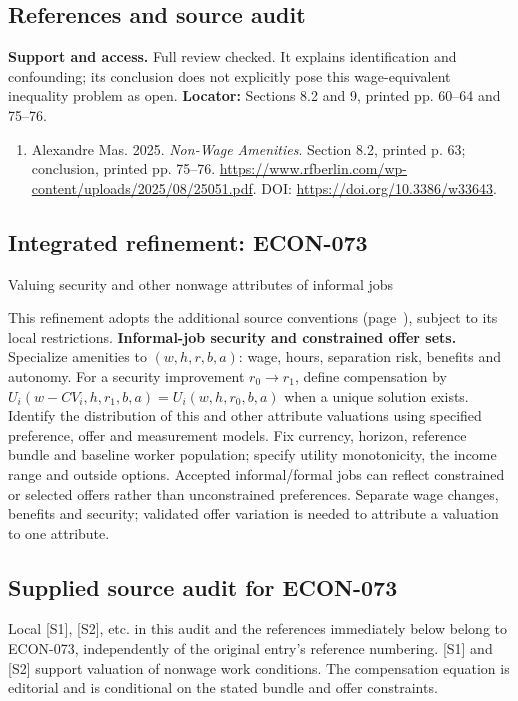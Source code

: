 \documentclass[11pt,a4paper]{article}
\begin{document}
\subsection*{References and source audit}
\textbf{Support and access.} Full review checked. It explains identification and confounding; its conclusion does not explicitly pose this wage-equivalent inequality problem as open. \textbf{Locator:} Sections 8.2 and 9, printed pp. 60--64 and 75--76.
\begin{enumerate}\raggedright
\item\hypertarget{definitions:source:30007637:1}{} Alexandre Mas. 2025. \emph{Non-Wage Amenities}. Section 8.2, printed p. 63; conclusion, printed pp. 75–76.
\url{https://www.rfberlin.com/wp-content/uploads/2025/08/25051.pdf}.
DOI: \url{https://doi.org/10.3386/w33643}.
\end{enumerate}

\subsection*{Integrated refinement: ECON-073}
{\sffamily\small\color{muted}Valuing security and other nonwage attributes of informal jobs\par}
This refinement adopts the additional source conventions
(page~\pageref{audited:conventions}), subject to its local restrictions.
\textbf{Informal-job security and constrained offer sets.}
Specialize amenities to $(w,h,r,b,a)$: wage, hours, separation risk, benefits and
autonomy. For a security improvement $r_0\to r_1$, define compensation by
$U_i(w-CV_i,h,r_1,b,a)=U_i(w,h,r_0,b,a)$ when a unique solution exists.
Identify the distribution of this and other attribute valuations using
specified preference, offer and measurement models. Fix currency, horizon,
reference bundle and baseline worker population; specify utility monotonicity,
the income range and outside options. Accepted informal/formal jobs can reflect
constrained or selected offers rather than unconstrained preferences. Separate
wage changes, benefits and security; validated offer variation is needed to
attribute a valuation to one attribute.
\subsection*{Supplied source audit for ECON-073}
Local [S1], [S2], etc. in this audit and the references immediately below
belong to ECON-073, independently of the original entry's reference numbering.
[S1] and [S2] support valuation of nonwage work conditions. The compensation equation is editorial and is conditional on the stated bundle and offer constraints.
\end{document}
